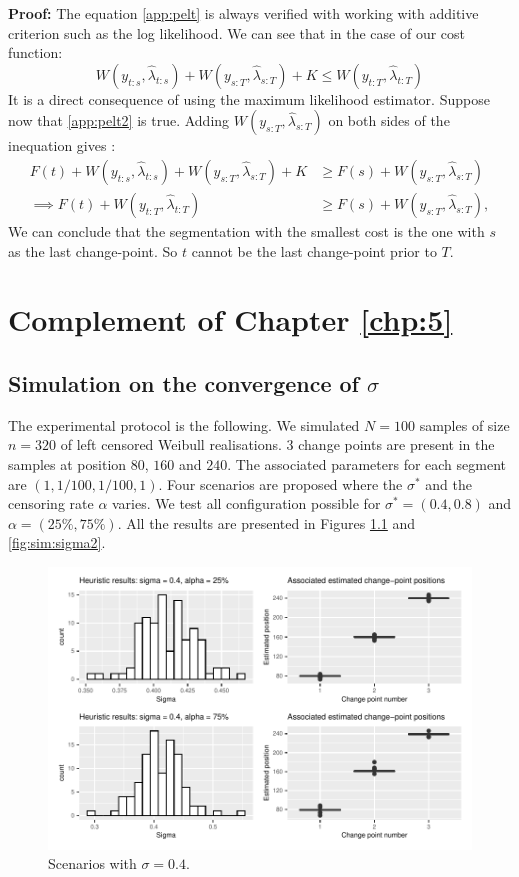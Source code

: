 \begin{appendices}
\textbf{Proof:} The equation \ref{app:pelt} is always verified with working with additive criterion such as the log likelihood. We can see that in the case of our cost function: 
$$W(y_{t:s},\hat\lambda_{t:s})+W(y_{s:T},\hat\lambda_{s:T})+K\leq W(y_{t:T},\hat\lambda_{t:T})$$
It is a direct consequence of using the maximum likelihood estimator. Suppose now that \ref{app:pelt2} is true. Adding $W(y_{s:T},\hat\lambda_{s:T})$ on both sides of the inequation gives : 
\begin{align*}
  F(t)+W(y_{t:s},\hat\lambda_{t:s})+W(y_{s:T},\hat\lambda_{s:T})+K &\geq F(s)+W(y_{s:T},\hat\lambda_{s:T}) \\
  \implies F(t)+W(y_{t:T},\hat\lambda_{t:T}) &\geq F(s)+W(y_{s:T},\hat\lambda_{s:T}),
\end{align*}
We can conclude that the segmentation with the smallest cost is the one with $s$ as the last change-point. So $t$ cannot be the last change-point prior to $T$.

\chapter{Complement of Chapter \ref{chp:5}}

\section{Simulation on the convergence of \texorpdfstring{$\sigma$}{s}} \label{app:sim:chap5}

The experimental protocol is the following. We simulated $N = 100$ samples of size $n = 320$ of left censored Weibull realisations. 3 change points are present in the samples at position $80$, $160$ and $240$. The associated parameters for each segment are $(1,1/100,1/100,1)$. Four scenarios are proposed where the $\sigma^*$ and the censoring rate $\alpha$ varies. We test all configuration possible for $\sigma^* = (0.4,0.8)$ and $\alpha = (25\%,75\%)$. All the results are presented in Figures \ref{fig:sim:sigma1} and \ref{fig:sim:sigma2}.     

\begin{figure}[ht]
    \centering
    \includegraphics{figs/App/SIM_CHAP5_1.pdf}
    \caption{Scenarios with $\sigma = 0.4$.}
    \label{fig:sim:sigma1}
\end{figure}


\end{appendices}

